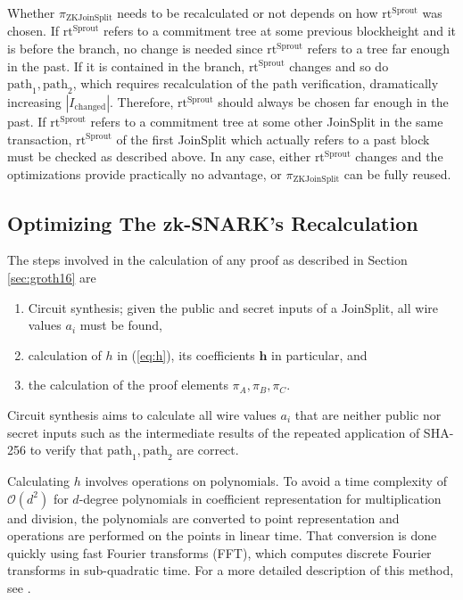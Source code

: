 \documentclass{article}
\begin{document}
Whether $\pi_\text{ZKJoinSplit}$ needs to be recalculated or not depends on how $\text{rt}^\text{Sprout}$ was chosen.
If $\text{rt}^\text{Sprout}$ refers to a commitment tree at some previous blockheight and it is before the branch, no change is needed since $\text{rt}^\text{Sprout}$ refers to a tree far enough in the past.
If it is contained in the branch, $\text{rt}^\text{Sprout}$ changes and so do $\text{path}_1,\text{path}_2$, which requires recalculation of the path verification, dramatically increasing $|I_\text{changed}|$.
Therefore, $\text{rt}^\text{Sprout}$ should always be chosen far enough in the past.
If $\text{rt}^\text{Sprout}$ refers to a commitment tree at some other JoinSplit in the same transaction, $\text{rt}^\text{Sprout}$ of the first JoinSplit which actually refers to a past block must be checked as described above.
In any case, either $\text{rt}^\text{Sprout}$ changes and the optimizations provide practically no advantage, or $\pi_\text{ZKJoinSplit}$ can be fully reused.

\subsection{Optimizing The zk-SNARK's Recalculation} \label{sec:opt}

The steps involved in the calculation of any proof as described in Section \ref{sec:groth16} are

\begin{enumerate}
        \item Circuit synthesis; given the public and secret inputs of a JoinSplit, all wire values $a_i$ must be found, 
        \item calculation of $h$ in (\ref{eq:h}), its coefficients $\boldsymbol{h}$ in particular, and
        \item the calculation of the proof elements $\pi_A, \pi_B, \pi_C$.
\end{enumerate}

Circuit synthesis aims to calculate all wire values $a_i$ that are neither public nor secret inputs such as the intermediate results of the repeated application of SHA-256 to verify that $\text{path}_1, \text{path}_2$ are correct.

Calculating $h$ involves operations on polynomials.
To avoid a time complexity of $\mathcal{O}(d^2)$ for $d$-degree polynomials in coefficient representation for multiplication and division, the polynomials are converted to point representation and operations are performed on the points in linear time.
That conversion is done quickly using fast Fourier transforms (FFT), which computes discrete Fourier transforms in sub-quadratic time.
For a more detailed description of this method, see \cite{cormen:clrs}.
\end{document}
